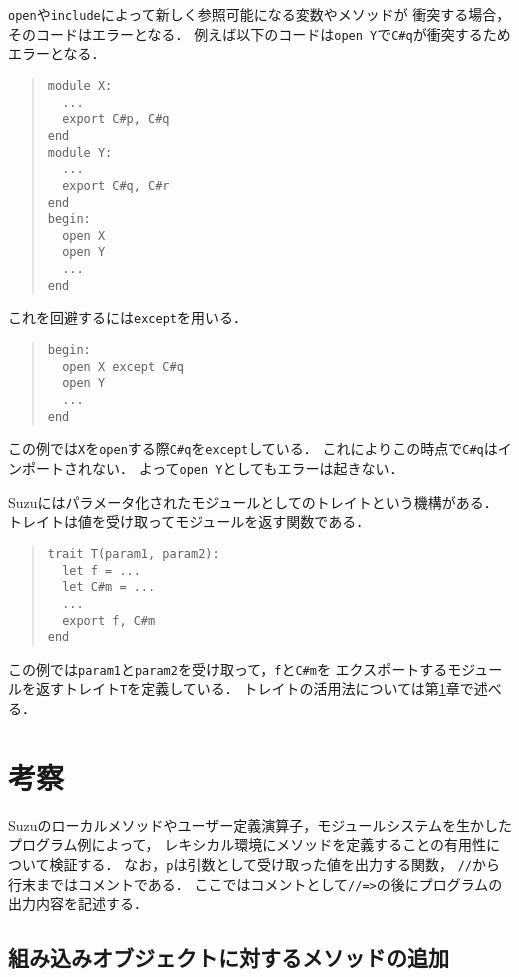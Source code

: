 \documentclass[a4paper,11pt,dvipdfmx]{jreport}
\begin{document}
\verb|open|や\verb|include|によって新しく参照可能になる変数やメソッドが
衝突する場合，そのコードはエラーとなる．
例えば以下のコードは\verb|open Y|で\verb|C#q|が衝突するためエラーとなる．
\begin{quote}
\begin{verbatim}
module X:
  ... 
  export C#p, C#q
end
module Y:
  ...
  export C#q, C#r
end
begin:
  open X
  open Y
  ...
end
\end{verbatim}
\end{quote}
これを回避するには\verb|except|を用いる．
\begin{quote}
\begin{verbatim}
begin:
  open X except C#q
  open Y
  ...
end
\end{verbatim}
\end{quote}
この例では\verb|X|を\verb|open|する際\verb|C#q|を\verb|except|している．
これによりこの時点で\verb|C#q|はインポートされない．
よって\verb|open Y|としてもエラーは起きない．

Suzuにはパラメータ化されたモジュールとしてのトレイトという機構がある．
トレイトは値を受け取ってモジュールを返す関数である．
\begin{quote}
\begin{verbatim}
trait T(param1, param2):
  let f = ...
  let C#m = ...
  ...
  export f, C#m
end
\end{verbatim}
\end{quote}
この例では\verb|param1|と\verb|param2|を受け取って，\verb|f|と\verb|C#m|を
エクスポートするモジュールを返すトレイト\verb|T|を定義している．
トレイトの活用法については第\ref{chapter:discussion}章で述べる．


\chapter{考察}
\label{chapter:discussion}

Suzuのローカルメソッドやユーザー定義演算子，モジュールシステムを生かした
プログラム例によって，
レキシカル環境にメソッドを定義することの有用性について検証する．
なお，\verb|p|は引数として受け取った値を出力する関数，
\verb|//|から行末まではコメントである．
ここではコメントとして\verb|//=>|の後にプログラムの出力内容を記述する．

\section{組み込みオブジェクトに対するメソッドの追加}
\end{document}
